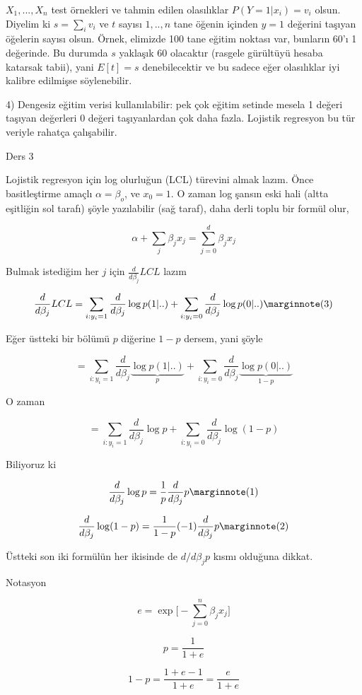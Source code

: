 \documentclass[12pt,fleqn]{article}\usepackage{../../common}
\begin{document}
$X_1,...,X_n$ test örnekleri ve tahmin edilen olasılıklar $P(Y=1 | x_i) = v_i$ 
olsun. Diyelim ki $s = \sum_i v_i$ ve $t$ sayısı $1,..,n$ tane öğenin
içinden $y = 1$ değerini taşıyan öğelerin sayısı olsun. Örnek, elimizde 100
tane eğitim noktası var, bunların 60'ı 1 değerinde. Bu durumda $s$ yaklaşık
60 olacaktır (rasgele gürültüyü hesaba katarsak tabii), yani  $E[t] = s$ 
denebilecektir ve bu sadece eğer olasılıklar iyi kalibre edilmişse
söylenebilir.

4) Dengesiz eğitim verisi kullanılabilir: pek çok eğitim setinde mesela 1
değeri taşıyan değerleri 0 değeri taşıyanlardan çok daha fazla. Lojistik
regresyon bu tür veriyle rahatça çalışabilir.
 
Ders 3

Lojistik regresyon için log olurluğun (LCL) türevini almak lazım. Önce
basitleştirme amaçlı $\alpha = \beta_o$, ve $x_0 = 1$. O zaman log şansın
eski hali (altta eşitliğin sol tarafı) şöyle yazılabilir (sağ taraf), daha
derli toplu bir formül olur,

$$
\alpha + \sum_j \beta_j x_j  = \sum_{j=0}^{d} \beta_j x_j
$$ 

Bulmak istediğim her $j$ için $\frac{d}{d \beta_j} LCL$ lazım

$$ 
\frac{d}{d \beta_j} LCL = 
\sum_{i:y_i=1} \frac{d}{d \beta_j} \log p(1|..)
+ \sum_{i:y_i=0} \frac{d}{d \beta_j} \log p(0|..)
\mlabel{3}
$$

Eğer üstteki bir bölümü $p$ diğerine $1-p$ dersem, yani şöyle

$$ 
= \sum_{i:y_i=1} \frac{d}{d \beta_j} \underbrace{\log p(1|..)}_{p}
+ \sum_{i:y_i=0} \frac{d}{d \beta_j} \underbrace{\log p(0|..)}_{1-p}
$$

O zaman 


$$ 
= \sum_{i:y_i=1} \frac{d}{d \beta_j}\log p
+ \sum_{i:y_i=0} \frac{d}{d \beta_j} \log (1-p)
$$

Biliyoruz ki

$$ 
\frac{d}{d \beta_j}\log p = \frac{1}{p}\frac{d}{d \beta_j} p
\mlabel{1}
$$

$$ 
\frac{d}{d \beta_j}\log (1-p) = \frac{1}{1-p}(-1)\frac{d}{d \beta_j} p
\mlabel{2}
$$

Üstteki son iki formülün her ikisinde de $d / d \beta_j p$ kısmı olduğuna
dikkat.

Notasyon

$$
e = \exp \big[ - \sum_{j=0}^n \beta_jx_j \big]
$$

$$
p = \frac{ 1}{1+e}
$$

$$
1-p = \frac{ 1+e-1}{1+e} = \frac{ e}{1+e}
$$
\end{document}
